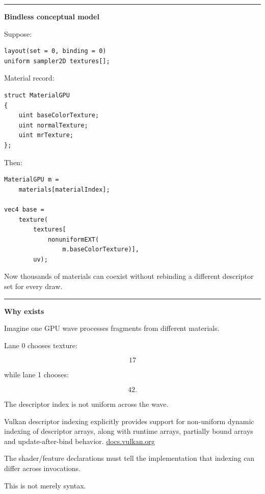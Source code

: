 \begin{center}\rule{0.5\linewidth}{0.5pt}\end{center}

\textbf{Bindless conceptual model}

Suppose:

\begin{verbatim}
layout(set = 0, binding = 0)
uniform sampler2D textures[];
\end{verbatim}

Material record:

\begin{verbatim}
struct MaterialGPU
{
    uint baseColorTexture;
    uint normalTexture;
    uint mrTexture;
};
\end{verbatim}

Then:

\begin{verbatim}
MaterialGPU m =
    materials[materialIndex];

vec4 base =
    texture(
        textures[
            nonuniformEXT(
                m.baseColorTexture)],
        uv);
\end{verbatim}

Now thousands of materials can coexist without rebinding a different descriptor set for every draw.

\begin{center}\rule{0.5\linewidth}{0.5pt}\end{center}

\textbf{Why  exists}

Imagine one GPU wave processes fragments from different materials.

Lane 0 chooses texture:

\[
17
\]

while lane 1 chooses:

\[
42.
\]

The descriptor index is not uniform across the wave.

Vulkan descriptor indexing explicitly provides support for non-uniform dynamic indexing of descriptor arrays, along with runtime arrays, partially bound arrays and update-after-bind behavior. \href{https://docs.vulkan.org/refpages/latest/refpages/source/VK_EXT_descriptor_indexing.html?utm_source=chatgpt.com}{docs.vulkan.org}

The shader/feature declarations must tell the implementation that indexing can differ across invocations.

This is not merely syntax.

